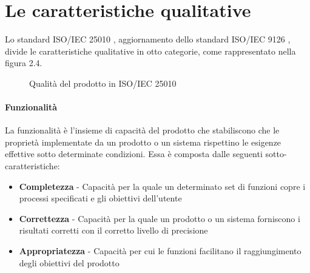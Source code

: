 \documentclass[../main.tex]{subfiles}
\begin{document}
\section{Le caratteristiche qualitative}
Lo standard ISO/IEC 25010 \cite{iso25010}, aggiornamento dello standard ISO/IEC 9126 \cite{iso9126}, divide le caratteristiche qualitative in otto categorie, come rappresentato nella figura 2.4.

\begin{figure}[H]
\centering
{}
\caption{Qualità del prodotto in ISO/IEC 25010 \cite{iso25010}}\label{fig:4}
\end{figure}

\paragraph{Funzionalità}
La funzionalità è l'insieme di capacità del prodotto che stabiliscono che le proprietà implementate da un prodotto o un sistema  rispettino le esigenze effettive sotto determinate condizioni. Essa è composta dalle seguenti sotto-caratteristiche:
\begin{itemize}
\item \textbf{Completezza} - Capacità per la quale un determinato set di funzioni copre i processi specificati e gli obiettivi dell'utente
\item \textbf{Correttezza} - Capacità per la quale un prodotto o un sistema forniscono i risultati corretti con il corretto livello di precisione
\item \textbf{Appropriatezza} - Capacità per cui le funzioni facilitano il raggiungimento degli obiettivi del prodotto
\end{itemize}
\end{document}
